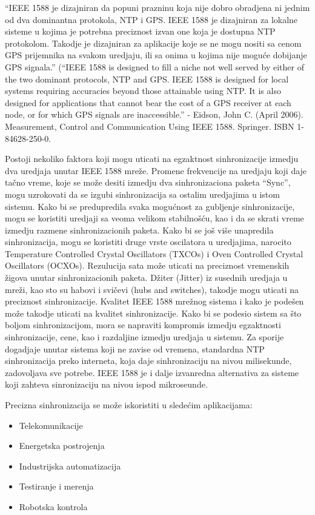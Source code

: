 \documentclass[a4paper,12pt, master]{etf}
\begin{document}
	``IEEE 1588 je dizajniran da popuni prazninu koja nije dobro obradjena ni
	jednim od dva dominantna protokola, NTP i GPS\@. IEEE 1588 je dizajniran za
	lokalne sisteme u kojima je	potrebna preciznost izvan one koja je dostupna
	NTP protokolom. Takodje je dizajniran za aplikacije koje se ne mogu nositi
	sa cenom GPS prijemnika na svakom uredjaju, ili sa onima u kojima nije
	mogu\'{c}e dobijanje GPS signala.'' (``IEEE 1588 is designed to fill a niche
	not well served by either of the two dominant protocols, NTP and GPS\@.
	IEEE 1588 is designed for local systems requiring accuracies beyond those
	attainable using NTP\@. It is also designed for applications that cannot
	bear the cost of a GPS receiver at each node, or for which GPS signals are
	inaccessible.'' - Eidson, John C. (April 2006). Measurement, Control and
	Communication Using IEEE 1588. Springer. ISBN 1-84628-250-0.

	Postoji nekoliko faktora koji mogu uticati na egzaktnost sinhronizacije
	izmedju dva	uredjaja unutar IEEE 1588 mre\v{z}e. Promene frekvencije na
	uredjaju koji daje ta\v{c}no vreme,	koje se mo\v{z}e desiti izmedju dva
	sinhronizaciona paketa ``Sync'', mogu uzrokovati da se izgubi
	sinhronizacija sa ostalim uredjajima u istom sistemu. Kako bi se
	predupredila svaka mogu\'{c}nost za gubljenje sinhronizacije, mogu se
	koristiti uredjaji sa veoma velikom	stabilno\v{s}\'{c}u, kao i da se skrati
	vreme izmedju razmene sinhronizacionih paketa. Kako bi se jo\v{s} vi\v{s}e
	unapredila sinhronizacija, mogu se koristiti druge vrste oscilatora u
	uredjajima, narocito Temperature Controlled Crystal Oscillators (TXCOs) i
	Oven Controlled Crystal	Oscillators (OCXOs). Rezulucija sata mo\v{z}e
	uticati na preciznost vremenskih \v{z}igova unutar sinhronizacionih paketa.
	D\v{z}iter (Jitter) iz susednih uredjaja u mre\v{z}i, kao sto su habovi i
	svi\v{c}evi (hubs and switches), takodje mogu uticati na preciznost
	sinhronizacije. Kvalitet IEEE 1588 mre\v{z}nog sistema i kako je
	pode\v{s}en mo\v{z}e takodje uticati na kvalitet sinhronizacije. Kako bi
	se podesio sistem sa \v{s}to boljom sinhronizacijom, mora se napraviti
	kompromis izmedju egzaktnosti sinhronizacije, cene, kao i razdaljine
	izmedju uredjaja u sistemu. Za sporije dogadjaje unutar sistema koji ne
	zavise od vremena, standardna NTP sinhronizacija preko interneta, koja daje
	sinhronizaciju na nivou milisekunde, zadovoljava sve potrebe. IEEE 1588 je
	i dalje izvanredna alternativa za sisteme koji zahteva sinronizaciju na
	nivou ispod	mikroseunde.

	Precizna sinhronizacija se mo\v{z}e iskoristiti u slede\'{c}im aplikacijama:
	\begin{itemize}
		\item Telekomunikacije
		\item Energetska postrojenja
		\item Industrijska automatizacija
		\item Testiranje i merenja
		\item Robotska kontrola
	\end{itemize}
\end{document}

